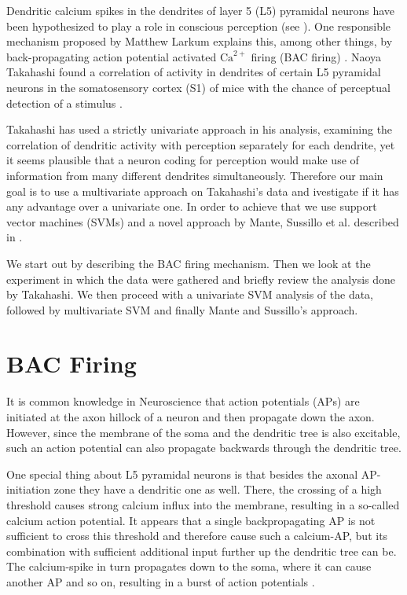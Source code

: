 \documentclass[
10pt, %
a4paper, %
oneside, %
headinclude,footinclude, %
BCOR5mm, %
]{scrartcl}
\begin{document}
Dendritic calcium spikes in the dendrites of layer 5 (L5) pyramidal neurons have been hypothesized to play a role in conscious perception (see \cite{Larkum2013}). One responsible mechanism proposed by Matthew Larkum explains this, among other things, by back-propagating action potential activated $\text{Ca}^{2+}$ firing (BAC firing) \cite{Larkum1999}.
Naoya Takahashi found a correlation of activity in dendrites of certain L5 pyramidal neurons in the somatosensory cortex (S1) of mice with the chance of perceptual detection of a stimulus \cite{Takahashi2016}.

Takahashi has used a strictly univariate approach in his analysis, examining the correlation of dendritic activity with perception separately for each dendrite, yet it seems plausible that a neuron coding for perception would make use of information from many different dendrites simultaneously. Therefore our main goal is to use a multivariate approach on Takahashi's data and ivestigate if it has any advantage over a univariate one. In order to achieve that we use support vector machines (SVMs) and a novel approach by Mante, Sussillo et al. described in \cite{Mante2013}.

We start out by describing the BAC firing mechanism. Then we look at the experiment in which the data were gathered and briefly review the analysis done by Takahashi. We then proceed with a univariate SVM analysis of the data, followed by multivariate SVM and finally Mante and Sussillo's approach.

\section{BAC Firing}

It is common knowledge in Neuroscience that action potentials (APs) are initiated at the axon hillock of a neuron and then propagate down the axon. However, since the membrane of the soma and the dendritic tree is also excitable, such an action potential can also propagate backwards through the dendritic tree.

One special thing about L5 pyramidal neurons is that besides the axonal AP-initiation zone they have a dendritic one as well. There, the crossing of a high threshold causes strong calcium influx into the membrane, resulting in a so-called calcium action potential. It appears that a single backpropagating AP is not sufficient to cross this threshold and therefore cause such a calcium-AP, but its combination with sufficient additional input further up the dendritic tree can be. The calcium-spike in turn propagates down to the soma, where it can cause another AP and so on, resulting in a burst of action potentials \cite{Larkum1999}.
\end{document}
